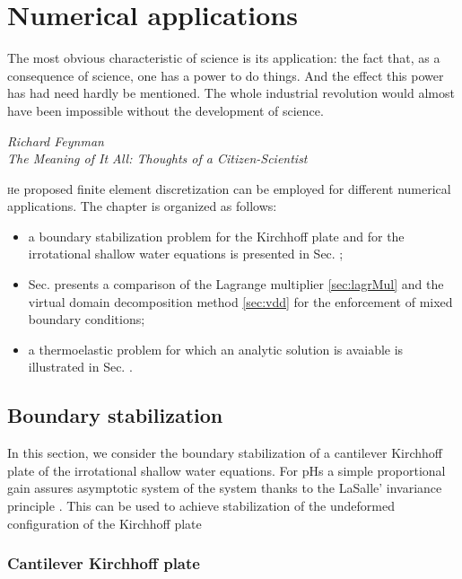 \chapter{Numerical applications}

\epigraph{The most obvious characteristic of science is its application: the fact that, as a consequence of science, one has a power to do things. And the effect this power has had need hardly be mentioned. The whole industrial revolution would almost have been impossible without the development of science.}{\textit{Richard Feynman \\ The Meaning of It All: Thoughts of a Citizen-Scientist}}
\minitoc

\lettrine{\color{theme}{T}}he proposed finite element discretization can be employed for different numerical applications. The chapter is organized as follows:
\begin{itemize}
	\item a boundary stabilization problem for the Kirchhoff plate and for the irrotational shallow water equations is presented in Sec. ;
	\item Sec.  presents a comparison of the Lagrange multiplier \ref{sec:lagrMul} and the virtual domain decomposition method \ref{sec:vdd} for the enforcement of mixed boundary conditions;
	\item a thermoelastic problem for which an analytic solution is avaiable is illustrated in Sec. .
\end{itemize}



\section{Boundary stabilization}\label{sec:bd_stab}

In this section, we consider the boundary stabilization of a cantilever Kirchhoff plate of the irrotational shallow water equations. For pHs a simple proportional gain assures asymptotic system of the system thanks to the LaSalle’ invariance principle \cite[chapter
6, proposition 6.2]{duindam2009}. This can be used to achieve stabilization of the undeformed configuration of the Kirchhoff plate


\subsection{Cantilever Kirchhoff plate}

